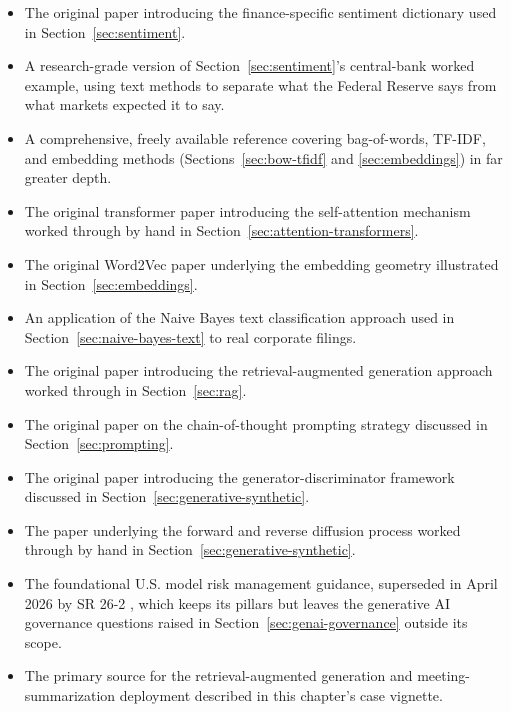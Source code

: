 \documentclass[../ai_in_finance]{subfiles}
\begin{document}
\begin{itemize}
    \item {} The original paper introducing the finance-specific sentiment dictionary used in Section~\ref{sec:sentiment}.
    \item {} A research-grade version of Section~\ref{sec:sentiment}'s central-bank worked example, using text methods to separate what the Federal Reserve says from what markets expected it to say.
    \item {} A comprehensive, freely available reference covering bag-of-words, TF-IDF, and embedding methods (Sections~\ref{sec:bow-tfidf} and \ref{sec:embeddings}) in far greater depth.
    \item {} The original transformer paper introducing the self-attention mechanism worked through by hand in Section~\ref{sec:attention-transformers}.
    \item {} The original Word2Vec paper underlying the embedding geometry illustrated in Section~\ref{sec:embeddings}.
    \item {} An application of the Naive Bayes text classification approach used in Section~\ref{sec:naive-bayes-text} to real corporate filings.
    \item {} The original paper introducing the retrieval-augmented generation approach worked through in Section~\ref{sec:rag}.
    \item {} The original paper on the chain-of-thought prompting strategy discussed in Section~\ref{sec:prompting}.
    \item {} The original paper introducing the generator-discriminator framework discussed in Section~\ref{sec:generative-synthetic}.
    \item {} The paper underlying the forward and reverse diffusion process worked through by hand in Section~\ref{sec:generative-synthetic}.
    \item {} The foundational U.S. model risk management guidance, superseded in April 2026 by SR 26-2 \parencite{frb2026revised}, which keeps its pillars but leaves the generative AI governance questions raised in Section~\ref{sec:genai-governance} outside its scope.
    \item {} The primary source for the retrieval-augmented generation and meeting-summarization deployment described in this chapter's case vignette.

\end{itemize}
\end{document}
